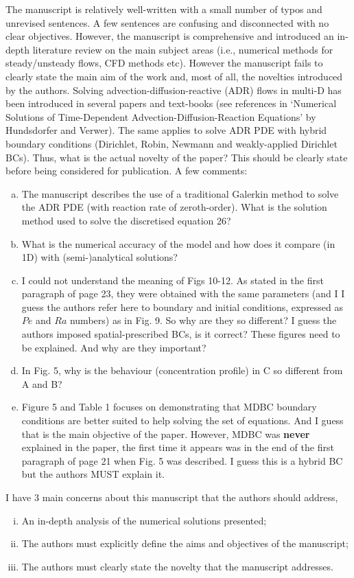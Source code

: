 \documentclass[14pt,twoside]{report}
\begin{document}
The manuscript is relatively well-written with a small number of typos and unrevised sentences. A few sentences are confusing and disconnected with no clear objectives.  However, the manuscript is comprehensive and introduced an in-depth literature review on the main subject areas (i.e., numerical methods for steady/unsteady flows, CFD methods etc). However the manuscript fails to clearly state the main aim of the work and, most of all, the novelties introduced by the authors. Solving advection-diffusion-reactive (ADR) flows in multi-D has been introduced in several papers and text-books (see references in `Numerical Solutions of Time-Dependent Advection-Diffusion-Reaction Equations' by Hundsdorfer and Verwer). The same applies to solve ADR PDE with hybrid boundary conditions (Dirichlet, Robin, Newmann and weakly-applied Dirichlet BCs). Thus, what is the actual novelty of the paper? This should be clearly state before being considered for publication. A few comments:
\begin{enumerate}[(a)] 
%
    \item The manuscript describes the use of a traditional Galerkin method to solve the ADR PDE (with reaction rate of zeroth-order). What is the solution method used to solve the discretised equation 26?
% 
    \item What is the numerical accuracy of the model and how does it compare (in 1D) with (semi-)analytical solutions?
%
    \item I could not understand the meaning of Figs 10-12. As stated in the first paragraph of page 23, they were obtained with the same parameters (and I I guess the authors refer here to boundary and initial conditions, expressed as $Pe$ and $Ra$ numbers) as in Fig. 9. So why are they so different? I guess the authors imposed spatial-prescribed BCs, is it correct? These figures need to be explained. And why are they important?
%
    \item In Fig. 5, why is the behaviour (concentration profile) in C so different from A and B?
%
    \item Figure 5 and Table 1 focuses on demonstrating that MDBC boundary conditions are better suited to help solving the set of equations. And I guess that is the main objective of the paper. However, MDBC was {\bf never} explained in the paper, the first time it appears was in the end of the first paragraph of page 21 when Fig. 5 was described. I guess this is a hybrid BC but the authors MUST explain it.
%
\end{enumerate}
I have 3 main concerns about this manuscript that the authors should address,
\begin{enumerate}[(i)]
   \item An in-depth analysis of the numerical solutions presented;
   \item The authors must explicitly define the aims and objectives of the manuscript;
   \item The authors must clearly state the novelty that the manuscript addresses.
\end{enumerate}
\end{document}

